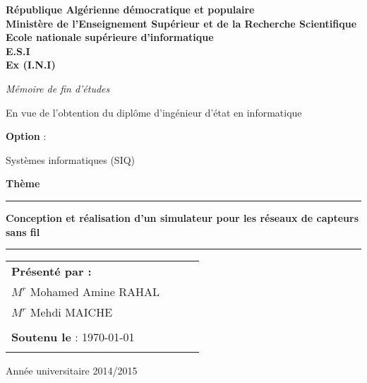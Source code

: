 \sloppy
\begin{titlepage}
\begin{center}
{\bf République Algérienne démocratique et populaire
\\ Ministère de l'Enseignement Supérieur et de la
Recherche Scientifique} \vspace{0.25cm}\\
{\bf {\large Ecole nationale supérieure d'informatique}}\\
{\bf E.S.I } \\ {\bf Ex (I.N.I)}\\

\vspace{0.3cm}

\Huge{\emph{{{\it {Mémoire de fin d'études }}}}}\\
\vspace{0.1cm}

\normalsize
\begin{center}
En vue de l'obtention du diplôme d'ingénieur d'état en informatique
\end{center}

\normalsize\textbf{Option }:\\
\normalsize
\begin{center}
Systèmes informatiques (SIQ)
\end{center}

\vspace{1.5cm}

\Huge\textbf{Thème}\\
\noindent\rule{\textwidth}{0.9mm}
\Large{{\textbf{Conception et réalisation d'un simulateur pour les réseaux de capteurs sans fil}}}
\noindent\rule{\textwidth}{0.9mm}
\end{center}
\begin{center}
\normalsize %
\vspace{1.5cm}
\begin{tabular}{llll}



\hspace{6cm}\textbf{\textbf{Présenté par :}}&\\
\hspace{5.9cm} $M^{r}$  Mohamed Amine RAHAL &\\
\hspace{5.9cm} $M^{r}$  Mehdi MAICHE &\\
&\\
\hspace{6.1cm}\textbf{Soutenu le }: \today
&\\\\

\end{tabular}
\end{center}
\vspace{0.1cm}
\begin{center}

Année universitaire 2014/2015
\end{center}
\end{titlepage}